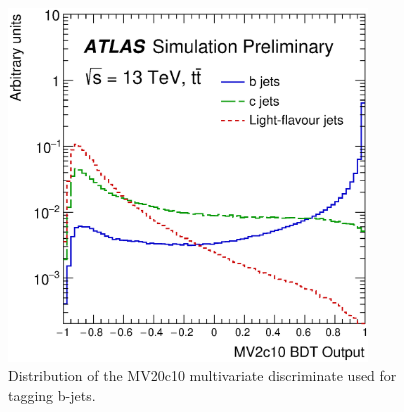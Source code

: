 \begin{figure}[htb]
  \begin{center}
    \includegraphics[width=0.85\textwidth]{figures/JetCalib/MV20c10.eps}\hspace{0.05\textwidth}
\end{center}
\caption{Distribution of the MV20c10 multivariate discriminate used for tagging b-jets.  }
\label{fig:jetCalibFlow} 
\end{figure}
